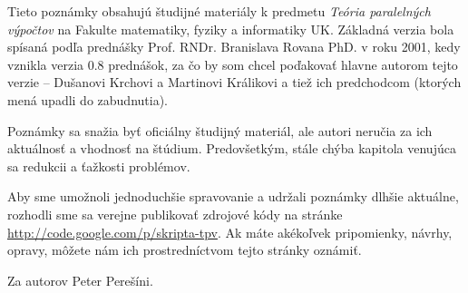 \documentclass[a4paper]{report}
\begin{document}
Tieto poznámky obsahujú študijné materiály k predmetu 
\emph{Teória paralelných výpočtov}
na Fakulte matematiky, fyziky a informatiky UK.
Základná verzia bola spísaná podľa prednášky
Prof. RNDr. Branislava Rovana PhD. v
roku 2001, kedy vznikla verzia 0.8 prednášok, za čo by som chcel
poďakovať hlavne autorom tejto verzie -- Dušanovi Krchovi a Martinovi
Králikovi a tiež ich predchodcom (ktorých mená upadli do zabudnutia).

Poznámky sa snažia byť oficiálny študijný materiál, ale
autori neručia za ich aktuálnosť a vhodnosť na štúdium. Predovšetkým,
stále chýba kapitola venujúca sa redukcii a ťažkosti problémov.

Aby sme umožnoli jednoduchšie spravovanie a udržali poznámky dlhšie
aktuálne, rozhodli sme sa verejne publikovať zdrojové kódy na stránke
\url{http://code.google.com/p/skripta-tpv}. Ak máte akékoľvek pripomienky,
návrhy, opravy, môžete nám ich prostredníctvom tejto stránky oznámiť.

Za autorov Peter Perešíni.


\tableofcontents













\end{document}
